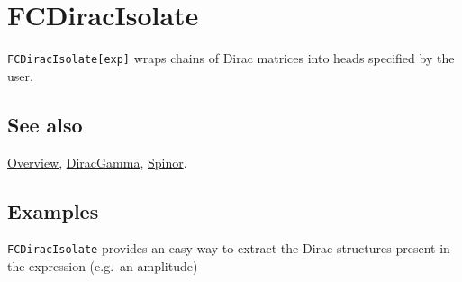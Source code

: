 \documentclass[../FeynCalcManual.tex]{subfiles}
\begin{document}
\hypertarget{fcdiracisolate}{%
\section{FCDiracIsolate}\label{fcdiracisolate}}

\texttt{FCDiracIsolate[\allowbreak{}exp]} wraps chains of Dirac matrices
into heads specified by the user.

\subsection{See also}

\hyperlink{toc}{Overview}, \hyperlink{diracgamma}{DiracGamma},
\hyperlink{spinor}{Spinor}.

\subsection{Examples}

\texttt{FCDiracIsolate} provides an easy way to extract the Dirac
structures present in the expression (e.g.~an amplitude)
\end{document}
